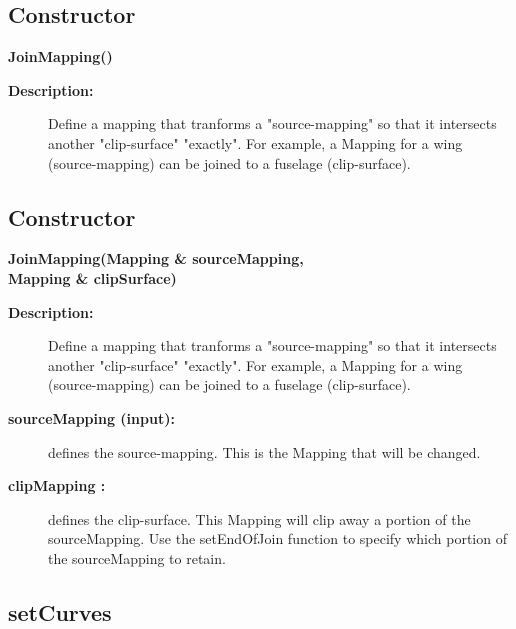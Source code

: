 \subsection{Constructor}
 
\newlength{\JoinMappingIncludeArgIndent}
\begin{flushleft} \textbf{%
\settowidth{\JoinMappingIncludeArgIndent}{JoinMapping(}%
JoinMapping() 
}\end{flushleft}
\begin{description}
\item[{\bf Description:}]  
  Define a mapping that tranforms a "source-mapping" so that
 it intersects another "clip-surface" "exactly". For example,
 a Mapping for a wing (source-mapping)  can be joined to a fuselage (clip-surface).

\end{description}
\subsection{Constructor}
 
\begin{flushleft} \textbf{%
\settowidth{\JoinMappingIncludeArgIndent}{JoinMapping(}%
JoinMapping(Mapping \& sourceMapping, \\ 
\hspace{\JoinMappingIncludeArgIndent}Mapping \& clipSurface)
}\end{flushleft}
\begin{description}
\item[{\bf Description:}]  
  Define a mapping that tranforms a "source-mapping" so that
 it intersects another "clip-surface" "exactly". For example,
 a Mapping for a wing (source-mapping)  can be joined to a fuselage (clip-surface).
 
\item[{\bf sourceMapping (input):}]  defines the source-mapping. This is the Mapping
  that will be changed. 
\item[{\bf clipMapping :}]  defines the clip-surface. This Mapping will clip away a
    portion of the sourceMapping. Use  the setEndOfJoin function to specify
    which portion of the sourceMapping to retain. 
\end{description}
\subsection{setCurves}
 
